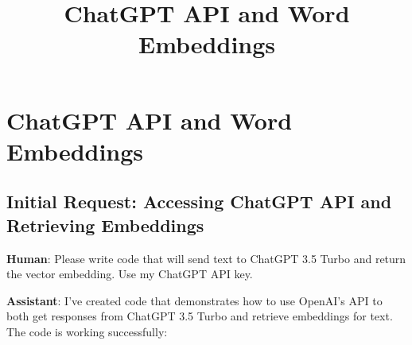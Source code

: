 \documentclass[
  letterpaper,
  DIV=11,
  numbers=noendperiod]{scrartcl}
\title{ChatGPT API and Word Embeddings}
\author{}
\date{}
\begin{document}
\maketitle


\section{ChatGPT API and Word
Embeddings}\label{chatgpt-api-and-word-embeddings}

\subsection{Initial Request: Accessing ChatGPT API and Retrieving
Embeddings}\label{initial-request-accessing-chatgpt-api-and-retrieving-embeddings}

\textbf{Human}: Please write code that will send text to ChatGPT 3.5
Turbo and return the vector embedding. Use my ChatGPT API key.

\textbf{Assistant}: I've created code that demonstrates how to use
OpenAI's API to both get responses from ChatGPT 3.5 Turbo and retrieve
embeddings for text. The code is working successfully:
\end{document}
